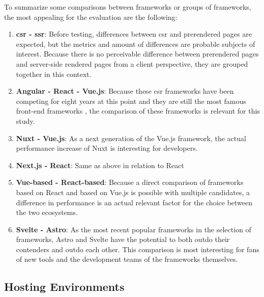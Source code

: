 \documentclass[a4paper, 12pt]{article}
\begin{document}
To summarize some comparisons between frameworks or groups of frameworks, the most appealing for the evaluation are the following:

\begin{enumerate}
  \item \textbf{\acrshort{csr} - \acrshort{ssr}}: Before testing, differences between \acrshort{csr} and prerendered pages are expected, but the metrics and amount of differences are probable subjects of interest.
  Because there is no perceivable difference between prerendered pages and server-side rendered pages from a client perspective, they are grouped together in this context.
  \item \textbf{Angular - React - Vue.js}: Because these \acrshort{csr} frameworks have been competing for eight years at this point and they are still the most famous front-end frameworks \citep{stateOfJs2023}, the comparison of these frameworks is relevant for this study.
  \item \textbf{Nuxt - Vue.js}: As a next generation of the Vue.js framework, the actual performance increase of Nuxt is interesting for developers.
  \item \textbf{Next.js - React}: Same as above in relation to React
  \item \textbf{Vue-based - React-based}: Because a direct comparison of frameworks based on React and based on Vue.js is possible with multiple candidates, a difference in performance is an actual relevant factor for the choice between the two ecosystems.
  \item \textbf{Svelte - Astro}: As the most recent popular frameworks in the selection of frameworks, Astro and Svelte have the potential to both outdo their contenders and outdo each other.
  This comparison is most interesting for fans of new tools and the development teams of the frameworks themselves.
\end{enumerate}


\subsection{Hosting Environments}\label{subsec:hostingenvironments}
% 
% 
\end{document}
